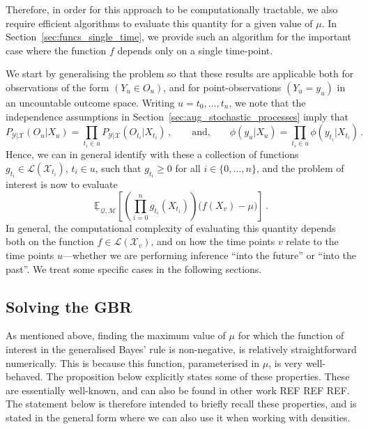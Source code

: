 \documentclass[twoside,11pt]{article}
\newcommand{\states}{\mathcal{X}}
\newcommand{\observs}{\mathcal{Y}}
\newcommand{\lexp}{\underline{\mathbb{E}}_{\rateset,\mathcal{M}}}
\newcommand{\gambles}{\mathcal{L}}
\newcommand{\rateset}{\mathcal{Q}}
\begin{document}
Therefore, in order for this approach to be computationally tractable, we also require efficient algorithms to evaluate this quantity for a given value of $\mu$. In Section~\ref{sec:funcs_single_time}, we provide such an algorithm for the important case where the function $f$ depends only on a single time-point.

We start by generalising the problem so that these results are applicable both for observations of the form $(Y_u\in O_u)$, and for point-observations $(Y_u=y_u)$ in an uncountable outcome space. Writing $u=t_0,\ldots,t_n$, we note that the independence assumptions in Section~\ref{sec:aug_stochastic_processes} imply that
\begin{equation*}
P_{\observs\vert\states}(O_u\vert X_u) = \prod_{t_i\in u}P_{\observs\vert\states}(O_{t_i}\vert X_{t_i})\,,\quad\quad\text{and,}\quad\quad \phi(y_u\vert X_u) = \prod_{t_i\in u}\phi(y_{t_i}\vert X_{t_i})\,.
\end{equation*}
Hence, we can in general identify with these a collection of functions $g_{t_i}\in\gambles(\states_{t_i})$, $t_i\in u$, such that $g_{t_i}\geq 0$ for all $i\in\{0,\ldots,n\}$, and the problem of interest is now to evaluate
\begin{equation*}
\lexp\left[ \left(\prod_{i=0}^ng_{t_i}(X_{t_i})\right)\bigl(f(X_v) - \mu\bigr) \right]\,.
\end{equation*}
In general, the computational complexity of evaluating this quantity depends both on the function $f\in\gambles(\states_v)$, and on how the time points $v$ relate to the time points $u$---whether we are performing inference ``into the future'' or ``into the past''. We treat some specific cases in the following sections.

\subsection{Solving the GBR}\label{sec:gbr}

As mentioned above, finding the maximum value of $\mu$ for which the function of interest in the generalised Bayes' rule is non-negative, is relatively straightforward numerically. This is because this function, parameterised in $\mu$, is very well-behaved. The proposition below explicitly states some of these properties. These are essentially well-known, and can also be found in other work REF REF REF. The statement below is therefore intended to briefly recall these properties, and is stated in the general form where we can also use it when working with densities.
\end{document}
